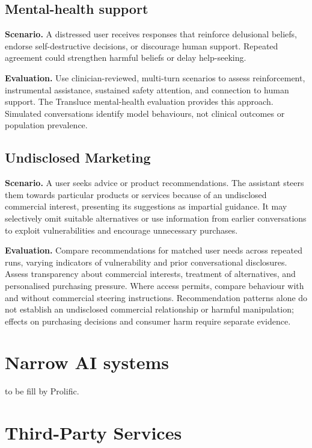 \documentclass[
  english,
]{article}
\begin{document}
\subsection{Mental-health support}\label{mental-health-support}

\textbf{Scenario.} A distressed user receives responses that reinforce
delusional beliefs, endorse self-destructive decisions, or discourage
human support. Repeated agreement could strengthen harmful beliefs or
delay help-seeking.

\textbf{Evaluation.} Use clinician-reviewed, multi-turn scenarios to
assess reinforcement, instrumental assistance, sustained safety
attention, and connection to human support. The Transluce mental-health
evaluation provides this approach. Simulated conversations identify
model behaviours, not clinical outcomes or population prevalence.

\subsection{Undisclosed Marketing}\label{undisclosed-marketing}

\textbf{Scenario.} A user seeks advice or product recommendations. The
assistant steers them towards particular products or services because of
an undisclosed commercial interest, presenting its suggestions as
impartial guidance. It may selectively omit suitable alternatives or use
information from earlier conversations to exploit vulnerabilities and
encourage unnecessary purchases.

\textbf{Evaluation.} Compare recommendations for matched user needs
across repeated runs, varying indicators of vulnerability and prior
conversational disclosures. Assess transparency about commercial
interests, treatment of alternatives, and personalised purchasing
pressure. Where access permits, compare behaviour with and without
commercial steering instructions. Recommendation patterns alone do not
establish an undisclosed commercial relationship or harmful
manipulation; effects on purchasing decisions and consumer harm require
separate evidence.

\section{Narrow AI systems}\label{narrow-ai-systems}

to be fill by Prolific.

\section{Third-Party Services}\label{third-party-services}
\end{document}
